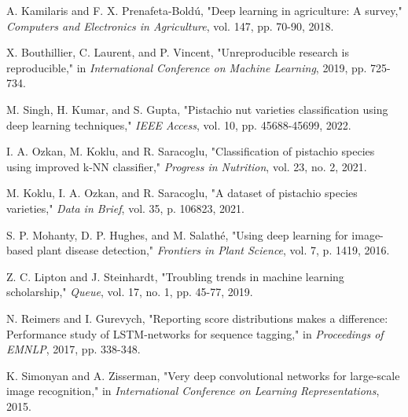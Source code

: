 \documentclass[conference]{IEEEtran}
\begin{document}
\begin{thebibliography}{00}
A. Kamilaris and F. X. Prenafeta-Boldú, "Deep learning in agriculture: A survey," \textit{Computers and Electronics in Agriculture}, vol. 147, pp. 70-90, 2018.

X. Bouthillier, C. Laurent, and P. Vincent, "Unreproducible research is reproducible," in \textit{International Conference on Machine Learning}, 2019, pp. 725-734.

M. Singh, H. Kumar, and S. Gupta, "Pistachio nut varieties classification using deep learning techniques," \textit{IEEE Access}, vol. 10, pp. 45688-45699, 2022.

I. A. Ozkan, M. Koklu, and R. Saracoglu, "Classification of pistachio species using improved k-NN classifier," \textit{Progress in Nutrition}, vol. 23, no. 2, 2021.

M. Koklu, I. A. Ozkan, and R. Saracoglu, "A dataset of pistachio species varieties," \textit{Data in Brief}, vol. 35, p. 106823, 2021.

S. P. Mohanty, D. P. Hughes, and M. Salathé, "Using deep learning for image-based plant disease detection," \textit{Frontiers in Plant Science}, vol. 7, p. 1419, 2016.

Z. C. Lipton and J. Steinhardt, "Troubling trends in machine learning scholarship," \textit{Queue}, vol. 17, no. 1, pp. 45-77, 2019.

N. Reimers and I. Gurevych, "Reporting score distributions makes a difference: Performance study of LSTM-networks for sequence tagging," in \textit{Proceedings of EMNLP}, 2017, pp. 338-348.

K. Simonyan and A. Zisserman, "Very deep convolutional networks for large-scale image recognition," in \textit{International Conference on Learning Representations}, 2015.
\end{thebibliography}
\end{document}
